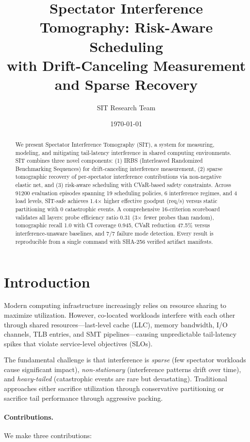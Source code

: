 \documentclass[11pt,twocolumn]{article}
\title{Spectator Interference Tomography: Risk-Aware Scheduling\\with Drift-Canceling Measurement and Sparse Recovery}
\author{SIT Research Team}
\date{\today}
\begin{document}
\maketitle

\begin{abstract}
We present Spectator Interference Tomography (SIT), a system for measuring,
modeling, and mitigating tail-latency interference in shared computing
environments. SIT combines three novel components: (1) IRBS (Interleaved
Randomized Benchmarking Sequences) for drift-canceling interference
measurement, (2) sparse tomographic recovery of per-spectator interference
contributions via non-negative elastic net, and (3) risk-aware scheduling
with CVaR-based safety constraints. Across 91200 evaluation episodes
spanning 19 scheduling policies, 6 interference regimes,
and 4 load levels, SIT-safe achieves 1.4$\times$ higher effective goodput (req/s)
versus static partitioning with 0 catastrophic events.
A comprehensive 16-criterion scoreboard validates all layers: probe efficiency
ratio 0.31 (3$\times$ fewer probes than random), tomographic recall
1.0 with CI coverage 0.945, CVaR reduction 47.5\%
versus interference-unaware baselines, and 7/7 failure mode detection.
Every result is reproducible from a single command with SHA-256 verified
artifact manifests.
\end{abstract}

\section{Introduction}

Modern computing infrastructure increasingly relies on resource sharing
to maximize utilization. However, co-located workloads interfere with
each other through shared resources---last-level cache (LLC), memory
bandwidth, I/O channels, TLB entries, and SMT pipelines---causing
unpredictable tail-latency spikes that violate service-level objectives (SLOs).

The fundamental challenge is that interference is \emph{sparse} (few
spectator workloads cause significant impact), \emph{non-stationary}
(interference patterns drift over time), and \emph{heavy-tailed}
(catastrophic events are rare but devastating). Traditional approaches
either sacrifice utilization through conservative partitioning or
sacrifice tail performance through aggressive packing.

\paragraph{Contributions.} We make three contributions:
\end{document}
